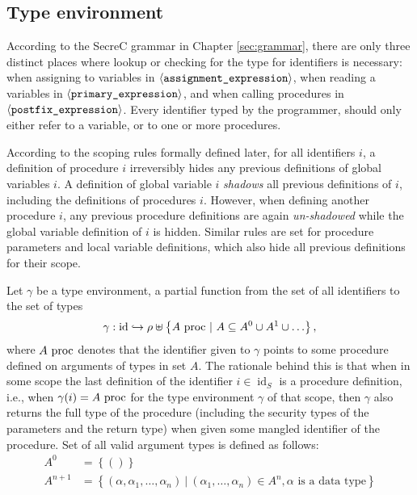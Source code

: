 \documentclass[a4paper, 10pt, draft]{report}
\newcommand{\mycode}[1]{\ensuremath{\mbox{\lstinline{#1}}}}
\newcommand{\bnfNT}[1]{\ensuremath{\mathbf{\left\langle\mbox{\texttt{#1}}\right\rangle}}}
\begin{document}
\subsection{Type environment}\label{sec:checking:typing:environment}

According to the SecreC grammar in Chapter \ref{sec:grammar}, there are only
three distinct places where lookup or checking for the type for identifiers is
necessary: when assigning to variables in \bnfNT{assignment\_expression}, when
reading a variables in \bnfNT{primary\_expression}, and when calling
procedures in \bnfNT{postfix\_expression}. Every identifier typed by the
programmer, should only either refer to a variable, or to one or more
procedures.

According to the scoping rules formally defined later, for all identifiers $i$,
a definition of procedure $i$ irreversibly hides any previous definitions of
global variables $i$. A definition of global variable $i$ \textit{shadows} all
previous definitions of $i$, including the definitions of procedures $i$.
However, when defining another procedure $i$, any previous procedure
definitions are again \textit{un-shadowed} while the global variable definition
of $i$ is hidden. Similar rules are set for procedure parameters and local
variable definitions, which also hide all previous definitions for their scope.

Let $\gamma$ be a type environment, a partial function from the set of all
identifiers to the set of types
\[
\gamma: \operatorname{id} \hookrightarrow \rho \uplus \left\{A\ \mycode{proc}\ |\ A \subseteq A^0 \cup A^1 \cup \dots \right\},
\]
where $A\ \mycode{proc}$ denotes that the identifier given to $\gamma$ points
to some procedure defined on arguments of types in set $A$. The rationale
behind this is that when in some scope the last definition of the identifier
$i\in\operatorname{id}_S$ is a procedure definition, i.e., when
$\gamma\!\left(i\right)=A\ \mycode{proc}$ for the type environment $\gamma$ of
that scope, then $\gamma$ also returns the full type of the procedure
(including the security types of the parameters and the return type) when given
some mangled identifier of the procedure. Set of all valid argument types is
defined as follows:
\[
\begin{array}{ll}
  A^{0} &= \left\{ () \right\} \\
  A^{n+1} &= \left\{ (\alpha, \alpha_1, \dots, \alpha_n)\ |\ \left( \alpha_1, \dots, \alpha_n \right) \in A^n, \text{$\alpha$ is a data type} \right\} \\
\end{array}
\]
\end{document}
